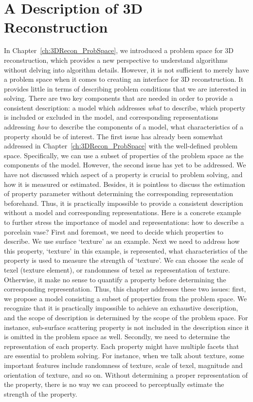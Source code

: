 
\chapter{A Description of 3D Reconstruction}
\label{ch:3DRecon_Desc}
In Chapter~\ref{ch:3DRecon_ProbSpace}, we introduced a problem space for 3D reconstruction, which provides a new perspective to understand algorithms without delving into algorithm details. However, it is not sufficient to merely have a problem space when it comes to creating an interface for 3D reconstruction. It provides little in terms of describing problem conditions that we are interested in solving. There are two key components that are needed in order to provide a consistent description: a model which addresses \textit{what} to describe, \ie which property is included or excluded in the model, and corresponding representations addressing \textit{how} to describe the components of a model, \ie what characteristics of a property should be of interest. The first issue has already been somewhat addressed in Chapter~\ref{ch:3DRecon_ProbSpace} with the well-defined problem space. Specifically, we can use a subset of properties of the problem space as the components of the model. However, the second issue has yet to be addressed. We have not discussed which aspect of a property is crucial to problem solving, and how it is measured or estimated. Besides, it is pointless to discuss the estimation of property parameter without determining the corresponding representation beforehand. Thus, it is practically impossible to provide a consistent description without a model and corresponding representations. Here is a concrete example to further stress the importance of model and representations: how to describe a porcelain vase? First and foremost, we need to decide which properties to describe. We use surface `texture' as an example. Next we need to address how this property, `texture' in this example, is represented, \ie what characteristics of the property is used to measure the strength of `texture'. We can choose the scale of texel (texture element), or randomness of texel as representation of texture. Otherwise, it make no sense to quantify a property before determining the corresponding representation. Thus, this chapter addresses these two issues: first, we propose a model consisting a subset of properties from the problem space. We recognize that it is practically impossible to achieve an exhaustive description, and the scope of description is determined by the scope of the problem space. For instance, sub-surface scattering property is not included in the description since it is omitted in the problem space as well. Secondly, we need to determine the representation of each property. Each property might have multiple facets that are essential to problem solving. For instance, when we talk about texture, some important features include randomness of texture, scale of texel, magnitude and orientation of texture, and so on. Without determining a proper representation of the property, there is no way we can proceed to perceptually estimate the strength of the property.
